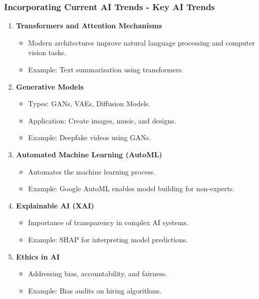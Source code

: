 \documentclass[aspectratio=169]{beamer}
\begin{document}
\begin{frame}[fragile]
    \frametitle{Incorporating Current AI Trends - Key AI Trends}
    \begin{enumerate}
        \item \textbf{Transformers and Attention Mechanisms}
            \begin{itemize}
                \item Modern architectures improve natural language processing and computer vision tasks.
                \item Example: Text summarization using transformers.
            \end{itemize}
        
        \item \textbf{Generative Models}
            \begin{itemize}
                \item Types: GANs, VAEs, Diffusion Models.
                \item Application: Create images, music, and designs.
                \item Example: Deepfake videos using GANs.
            \end{itemize}
        
        \item \textbf{Automated Machine Learning (AutoML)}
            \begin{itemize}
                \item Automates the machine learning process.
                \item Example: Google AutoML enables model building for non-experts.
            \end{itemize}
        
        \item \textbf{Explainable AI (XAI)}
            \begin{itemize}
                \item Importance of transparency in complex AI systems.
                \item Example: SHAP for interpreting model predictions.
            \end{itemize}
        
        \item \textbf{Ethics in AI}
            \begin{itemize}
                \item Addressing bias, accountability, and fairness.
                \item Example: Bias audits on hiring algorithms.
            \end{itemize}
    \end{enumerate}
\end{frame}
\end{document}

